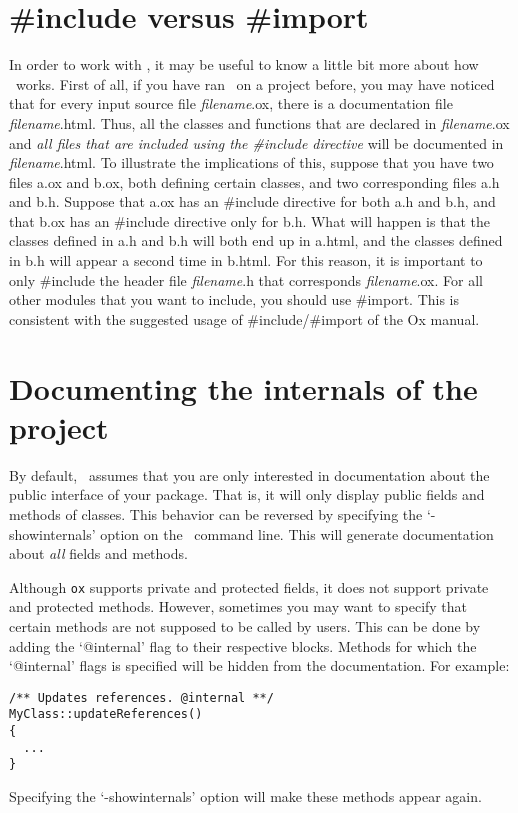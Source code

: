 \section{\#include versus \#import}
In order to work with \oxdoc, it may be useful to know a little bit more about how
\oxdoc~works. First of all, if you have ran \oxdoc~on a project before, you may have
noticed that for every input source file \textit{filename}.ox, there is a documentation file 
\textit{filename}.html. Thus, all the classes and functions that are declared in \textit{filename}.ox
and \textit{all files that are included using the \#include directive}
will be documented in \textit{filename}.html. To illustrate the implications of this, suppose that
you have two files a.ox and b.ox, both defining certain classes, and two corresponding
files a.h and b.h. Suppose that a.ox has an \#include directive for both a.h and b.h,
and that b.ox has an \#include directive only for b.h.
What will happen is that the classes defined in a.h and b.h will both end up in a.html,
and the classes defined in b.h will appear a second time in b.html. 
For this reason, it is important to only \#include the header file \textit{filename}.h that 
corresponds \textit{filename}.ox. For all other modules that you want to include, you should 
use \#import. This is consistent with the suggested usage of \#include/\#import of the Ox manual.


\section{Documenting the internals of the project}
By default, \oxdoc~assumes that you are only interested in documentation about the public interface
of your package. That is, it will only display public fields and methods of classes. 
This behavior can be reversed by specifying the `-showinternals' option on the \oxdoc~command line. 
This will generate documentation about \textit{all} fields and methods. 

Although {\tt ox} supports private and protected fields, it does not support private and protected methods.
However, sometimes you may want to specify that certain methods are not supposed to be called by users. This
can be done by adding the `@internal' flag to their respective blocks.
Methods for which the `@internal' flags is specified will be hidden from the documentation. For example:
\begin{lstlisting}
/** Updates references. @internal **/
MyClass::updateReferences()
{
  ...
}
\end{lstlisting}
Specifying the `-showinternals' option will make these methods appear again.
